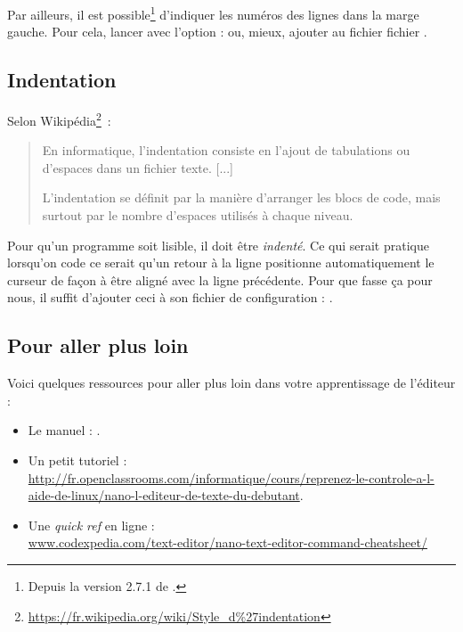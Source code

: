 \documentclass[a4paper,11pt]{style-esi/td}
\begin{document}
		Par ailleurs, il est possible\footnote{Depuis la version
		2.7.1 de .} d'indiquer les numéros des 
		lignes dans la
		marge gauche. Pour cela, lancer  avec l'option 
		 :  ou, mieux, 
	    ajouter  au fichier 
	    fichier .
			
	\subsection{Indentation}
				 
        Selon Wikipédia\footnote{\url{https://fr.wikipedia.org/wiki/Style_d\%27indentation}}~:
        \begin{quote}
        \og{}En informatique, l'indentation consiste en l'ajout de tabulations ou 
        d'es\-pa\-ces dans un fichier texte. [...]

        L'indentation se définit par la manière d'arranger les blocs de code, 
        mais surtout par le nombre d'espaces utilisés à chaque niveau.\fg{} 
        \end{quote}
        
		Pour qu'un programme soit lisible, 
		il doit être \textit{indenté}. 
		Ce qui serait pratique lorsqu'on code ce serait qu'un retour à la ligne 
		positionne automatiquement le curseur de façon à être 
		aligné avec la ligne précédente. 
		Pour que  fasse ça pour nous, 
		il suffit d'ajouter	ceci à son fichier de configuration : .
			
	\subsection{Pour aller plus loin} 
		
		Voici quelques ressources pour aller plus loin dans votre apprentissage de l'éditeur :
		\begin{itemize}
		\item Le manuel : .
		\item Un petit tutoriel : 
			\\{\tiny\url{http://fr.openclassrooms.com/informatique/cours/reprenez-le-controle-a-l-aide-de-linux/nano-l-editeur-de-texte-du-debutant}}.
		\item Une \textit{quick ref} en ligne : 
			\\{\small\url{www.codexpedia.com/text-editor/nano-text-editor-command-cheatsheet/}}
		\end{itemize}	
\end{document}
